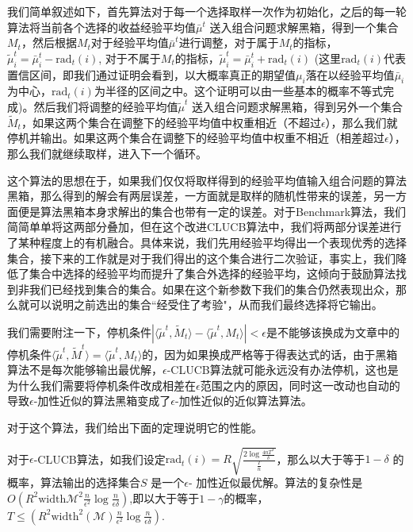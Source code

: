 \documentclass[bachelor]{thuthesis}
\begin{document}
我们简单叙述如下，首先算法对于每一个选择取样一次作为初始化，之后的每一轮算法将当前各个选择的收益经验平均值$\bar{\mu}^{t}$ 送入组合问题求解黑箱，得到一个集合$M_t$，然后根据$M_t$对于经验平均值$\bar{\mu}^{t}$进行调整，对于属于$M_t$的指标，$\tilde{\mu}_i^t=\bar{\mu}_i^t-\text{rad}_t(i)$, 对于不属于$M_t$的指标，$\tilde{\mu}_i^t=\bar{\mu}_i^t+\text{rad}_t(i)$ (这里$\text{rad}_t(i)$代表置信区间，即我们通过证明会看到，以大概率真正的期望值$\mu_i$落在以经验平均值$\bar{\mu}_i$为中心，$\text{rad}_t(i)$为半径的区间之中。这个证明可以由一些基本的概率不等式完成)。然后我们将调整的经验平均值$\tilde{\mu}^{t}$ 送入组合问题求解黑箱，得到另外一个集合$\tilde{M}_t$，如果这两个集合在调整下的经验平均值中权重相近（不超过$\epsilon$），那么我们就停机并输出。如果这两个集合在调整下的经验平均值中权重不相近（相差超过$\epsilon$），那么我们就继续取样，进入下一个循环。

这个算法的思想在于，如果我们仅仅将取样得到的经验平均值输入组合问题的算法黑箱，那么得到的解会有两层误差，一方面就是取样的随机性带来的误差，另一方面便是算法黑箱本身求解出的集合也带有一定的误差。对于Benchmark算法，我们简简单单将这两部分叠加，但在这个改进CLUCB算法中，我们将两部分误差进行了某种程度上的有机融合。具体来说，我们先用经验平均得出一个表现优秀的选择集合，接下来的工作就是对于我们得出的这个集合进行二次验证，事实上，我们降低了集合中选择的经验平均而提升了集合外选择的经验平均，这倾向于鼓励算法找到非我们已经找到集合的集合。如果在这个新参数下我们的集合仍然表现出众，那么就可以说明之前选出的集合``经受住了考验"，从而我们最终选择将它输出。

我们需要附注一下，停机条件$|\langle \tilde{\mu}^t,\tilde{M}_t\rangle-\langle \tilde{\mu}^t,M_t\rangle|<\epsilon$是不能够该换成为文章\cite{cpemab}中的停机条件$\langle\tilde{\mu}^{t},\tilde{M}^{t}\rangle=\langle\tilde{\mu}^{t},M_t\rangle$的，因为如果换成严格等于得表达式的话，由于黑箱算法不是每次能够输出最优解，$\epsilon$-CLUCB算法就可能永远没有办法停机，这也是为什么我们需要将停机条件改成相差在$\epsilon$范围之内的原因，同时这一改动也自动的导致$\epsilon$-加性近似的算法黑箱变成了$\epsilon$-加性近似的近似算法算法。

对于这个算法，我们给出下面的定理说明它的性能。

\begin{theorem}
\label{thm:eclucb}

对于$\epsilon$-CLUCB算法，如我们设定$\text{rad}_t(i)=R\sqrt{\frac{2\log \frac{4nT^3}{\delta}}{\frac{T}{n}}}$，那么以大于等于$1-\delta$ 的概率，算法输出的选择集合$S$ 是一个$\epsilon$- 加性近似最优解。算法的复杂性是$O\left(R^2\text{width}{\mathcal{M}}^2\frac{n}{\epsilon^2}\log\frac{n}{\epsilon\delta}\right)$,即以大于等于$1-\gamma$的概率，$T\le \left(R^2\text{width}^2({\mathcal{M}})\frac{n}{\epsilon^2}\log\frac{n}{\epsilon\delta}\right)$.

\end{theorem}
\end{document}
